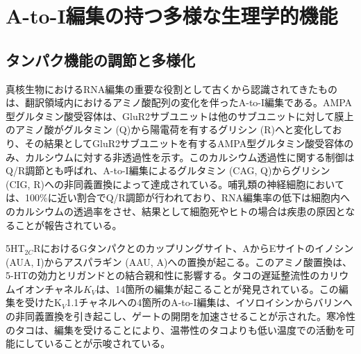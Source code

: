 \section{A-to-I編集の持つ多様な生理学的機能}
\subsection{タンパク機能の調節と多様化}
真核生物におけるRNA編集の重要な役割として古くから認識されてきたものは、翻訳領域内におけるアミノ酸配列の変化を伴ったA-to-I編集である。AMPA型グルタミン酸受容体は、GluR2サブユニットは他のサブユニットに対して膜上のアミノ酸がグルタミン (Q)から陽電荷を有するグリシン (R)へと変化しており、その結果としてGluR2サブユニットを有するAMPA型グルタミン酸受容体のみ、カルシウムに対する非透過性を示す。このカルシウム透過性に関する制御はQ/R調節とも呼ばれ、A-to-I編集によるグルタミン (CAG, Q)からグリシン (CIG, R)への非同義置換によって達成されている。哺乳類の神経細胞においては、100\%に近い割合でQ/R調節が行われており、RNA編集率の低下は細胞内へのカルシウムの透過率をさせ、結果として細胞死やヒトの場合は疾患の原因となることが報告されている。
\par
5HT$_{2C}$RにおけるGタンパクとのカップリングサイト、AからEサイトのイノシン (AUA, I)からアスパラギン (AAU, A)への置換が起こる。このアミノ酸置換は、5-HTの効力とリガンドとの結合親和性に影響する。タコの遅延整流性のカリウムイオンチャネル$K_{V}$は、14箇所の編集が起こることが発見されている。この編集を受けたK$_{V}$1.1チャネルへの4箇所のA-to-I編集は、イソロイシンからバリンへの非同義置換を引き起こし、ゲートの開閉を加速させることが示された。寒冷性のタコは、編集を受けることにより、温帯性のタコよりも低い温度での活動を可能にしていることが示唆されている。


